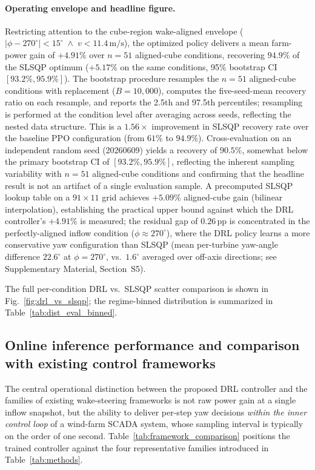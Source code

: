 \documentclass[final,5p,times]{elsarticle}
\begin{document}
\paragraph{Operating envelope and headline figure.}
Restricting attention to the cube-region wake-aligned envelope ($|\phi\!-\!270^\circ|\!<\!15^\circ \;\wedge\; v\!<\!11.4\,\mathrm{m/s}$), the optimized policy delivers a mean farm-power gain of $\mathbf{+4.91\%}$ over $n{=}51$ aligned-cube conditions, recovering $94.9\%$ of the SLSQP optimum ($+5.17\%$ on the same conditions, 95\% bootstrap CI $[93.2\%, 95.9\%]$). The bootstrap procedure resamples the $n{=}51$ aligned-cube conditions with replacement ($B{=}10{,}000$), computes the five-seed-mean recovery ratio on each resample, and reports the 2.5th and 97.5th percentiles; resampling is performed at the condition level after averaging across seeds, reflecting the nested data structure. This is a $1.56{\times}$ improvement in SLSQP recovery rate over the baseline PPO configuration (from $61\%$ to $94.9\%$). Cross-evaluation on an independent random seed (20260609) yields a recovery of $90.5\%$, somewhat below the primary bootstrap CI of $[93.2\%, 95.9\%]$, reflecting the inherent sampling variability with $n{=}51$ aligned-cube conditions and confirming that the headline result is not an artifact of a single evaluation sample. A precomputed SLSQP lookup table on a $91{\times}11$ grid achieves $+5.09\%$ aligned-cube gain (bilinear interpolation), establishing the practical upper bound against which the DRL controller's $+4.91\%$ is measured; the residual gap of $0.26$\,pp is concentrated in the perfectly-aligned inflow condition ($\phi{\approx}270^\circ$), where the DRL policy learns a more conservative yaw configuration than SLSQP (mean per-turbine yaw-angle difference $22.6^\circ$ at $\phi{=}270^\circ$, vs.\ $1.6^\circ$ averaged over off-axis directions; see Supplementary Material, Section~S5).

The full per-condition DRL vs.\ SLSQP scatter comparison is shown in Fig.~\ref{fig:drl_vs_slsqp}; the regime-binned distribution is summarized in Table~\ref{tab:dist_eval_binned}.

\subsection{Online inference performance and comparison with existing control frameworks}\label{sec:online_perf}

The central operational distinction between the proposed DRL controller and the families of existing wake-steering frameworks is not raw power gain at a single inflow snapshot, but the ability to deliver per-step yaw decisions \emph{within the inner control loop} of a wind-farm SCADA system, whose sampling interval is typically on the order of one second. Table~\ref{tab:framework_comparison} positions the trained controller against the four representative families introduced in Table~\ref{tab:methods}.
\end{document}
